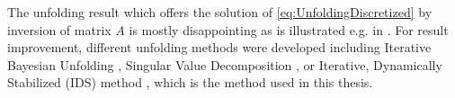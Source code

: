 The unfolding result which offers the solution of
\eqref{eq:UnfoldingDiscretized} by inversion of matrix $A$ is mostly
disappointing as is illustrated e.g. in \cite{UnfoldingExplained}. For result
improvement, different unfolding methods were developed including Iterative
Bayesian Unfolding \cite{IterativeBayesianUnfolding}, Singular Value
Decomposition \cite{SingularValueDecomposition}, or Iterative, Dynamically
Stabilized (IDS) method \cite{IterativeDynamicallyStabilized}, which is the
method used in this thesis. 


